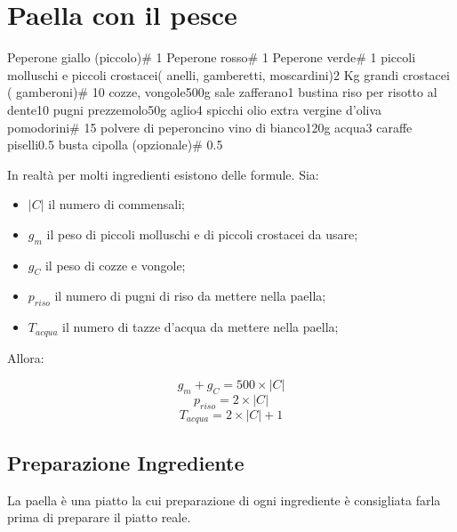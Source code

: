 \section{Paella con il pesce}

\generalRecipeInfos{}

\ingredienti%
    {Peperone giallo (piccolo)}{\# 1}%
    {Peperone rosso}{\# 1}%
    {Peperone verde}{\# 1}%
    {piccoli molluschi e piccoli crostacei(\eg{} anelli, gamberetti, moscardini)}{2 Kg}%
    {grandi crostacei (\eg{} gamberoni)}{\# 10}%
    {cozze, vongole}{500g}%
    {sale}{\qb{}}%
    {zafferano}{1 bustina}%
    {riso per risotto al dente}{10 pugni}%
    {prezzemolo}{50g}%
    {aglio}{4 spicchi}%
    {olio extra vergine d'oliva}{\qb{}}%
    {pomodorini}{\# 15}%
    {polvere di peperoncino}{\qb{}}%
    {vino di bianco}{120g}%
    {acqua}{3 caraffe}%
    {piselli}{0.5 busta}%
    {cipolla (opzionale)}{\# 0.5}%

In realtà per molti ingredienti esistono delle formule.
Sia:

\begin{itemize}
    \item $|C|$ il numero di commensali;
    \item $g_m$ il peso di piccoli molluschi e di piccoli crostacei da usare;
    \item $g_C$ il peso di cozze e vongole;
    \item $p_{riso}$ il numero di pugni di riso da mettere nella paella;
    \item $T_{acqua}$ il numero di tazze d'acqua da mettere nella paella;
\end{itemize}

Allora:

$$g_m + g_C = 500 \times |C|$$
$$p_{riso} = 2 \times |C|$$
$$T_{acqua} = 2 \times |C| + 1$$


\subsection{Preparazione Ingrediente}

La paella è una piatto la cui preparazione di ogni ingrediente è consigliata farla prima di preparare il piatto reale.

